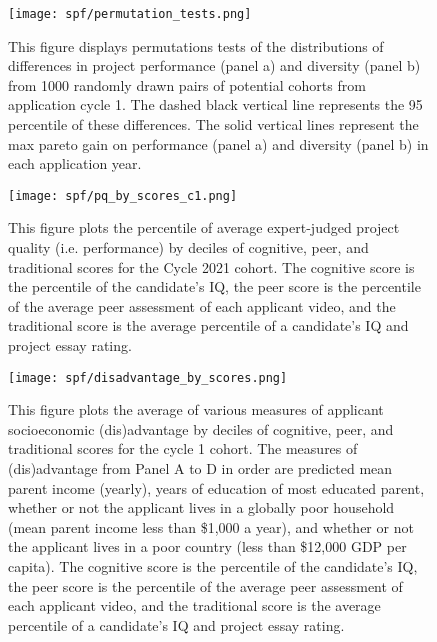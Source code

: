     
    \newpage
    \begin{figure}[!htb]
    \centering
        \caption{This figure displays permutations tests of the distributions of differences in project performance (panel a) and diversity (panel b) from 1000 randomly drawn pairs of potential cohorts from application cycle 1. The dashed black vertical line represents the 95 percentile of these differences. The solid vertical lines represent the max pareto gain on performance (panel a) and diversity (panel b) in each application year.} \label{fig:permutation_tests}
      \texttt{[image: spf/permutation\_tests.png]} 
    \end{figure}
    
    \newpage
    \begin{figure}[!htb]
    \centering
        \caption{This figure plots the percentile of average expert-judged project quality (i.e. performance) by deciles of cognitive, peer, and traditional scores for the Cycle 2021 cohort. The cognitive score is the percentile of the candidate's IQ, the peer score is the percentile of the average peer assessment of each applicant video, and the traditional score is the average percentile of a candidate's IQ and project essay rating.   } \label{fig:alt_talent_dist}
      \texttt{[image: spf/pq\_by\_scores\_c1.png]} 
    \end{figure}
    
    \newpage
    \begin{figure}[!htb]
    \centering
        \caption{This figure plots the average of various measures of applicant socioeconomic (dis)advantage by deciles of cognitive, peer, and traditional scores for the cycle 1 cohort. The measures of (dis)advantage from Panel A to D in order are predicted mean parent income (yearly), years of education of most educated parent, whether or not the applicant lives in a globally poor household (mean parent income less than \$1,000 a year), and whether or not the applicant lives in a poor country (less than \$12,000 GDP per capita). The cognitive score is the percentile of the candidate's IQ, the peer score is the percentile of the average peer assessment of each applicant video, and the traditional score is the average percentile of a candidate's IQ and project essay rating.  } \label{fig:disadvantage_corr}
      \texttt{[image: spf/disadvantage\_by\_scores.png]} 
    \end{figure}
    
